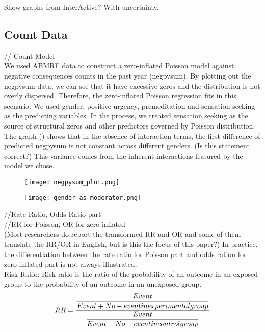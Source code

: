 \documentclass[jou, apacite]{apa6}
\begin{document}
Show graphs from InterActive? With uncertainty.

\subsection{Count Data}
// Count Model \\
We used ABMRF data to construct a zero-inflated Poisson model against negative consequences counts in the past year (negpysum). By plotting out the negpysum data, we can see that it have excessive zeros and the distribution is not overly dispersed.  Therefore, the zero-inflated Poisson regression fits in this scenario. We used gender, positive urgency, premeditation and sensation seeking as the predicting variables. In the process, we treated sensation seeking as the source of structural zeros and other predictors governed by Poisson distribution. The graph () shows that in the absence of interaction terms, the first difference of predicted negpysum is not constant across different genders. (Is this statement correct?) This variance comes from the inherent interactions featured by the model we chose.

\begin{figure}[h]
\texttt{[image: negpysum\_plot.png]}
\end{figure}

\begin{figure}[h]
\texttt{[image: gender\_as\_moderator.png]}
\end{figure}

//Rate Ratio, Odds Ratio part \\
//RR for Poisson, OR for zero-inflated \\
(Most researchers do report the transformed RR and OR and some of them translate the RR/OR in English, but is this the focus of this paper?)
In practice, the differentiation between the rate ratio for Poisson part and odds ration for zero-inflated part is not always illustrated. \\

Risk Ratio: Risk ratio is the ratio of the probability of an outcome in an exposed group to the probability of an outcome in an unexposed group.\\
\begin{equation}
RR = \dfrac{\dfrac{Event}{Event + No-event \\in experimental group}}{\dfrac{Event}{Event + No-event in control group}}
\end{equation}
\end{document}
